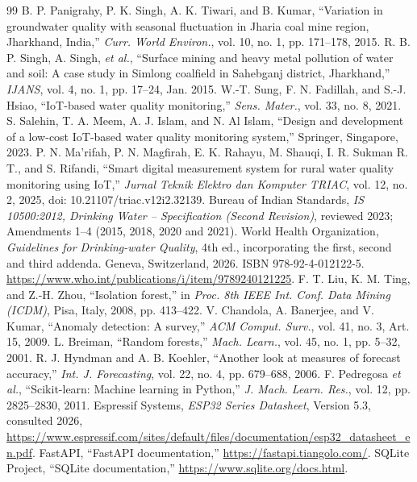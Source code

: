 \documentclass[10pt,letterpaper,twocolumn]{article}
\begin{document}
\footnotesize
\setlength{\itemsep}{0pt}
\setlength{\parskip}{0pt}
\begin{thebibliography}{99}
 B. P. Panigrahy, P. K. Singh, A. K. Tiwari, and B. Kumar, ``Variation in groundwater quality with seasonal fluctuation in Jharia coal mine region, Jharkhand, India,'' \emph{Curr. World Environ.}, vol. 10, no. 1, pp. 171--178, 2015.
 R. B. P. Singh, A. Singh, \emph{et al.}, ``Surface mining and heavy metal pollution of water and soil: A case study in Simlong coalfield in Sahebganj district, Jharkhand,'' \emph{IJANS}, vol. 4, no. 1, pp. 17--24, Jan. 2015.
 W.-T. Sung, F. N. Fadillah, and S.-J. Hsiao, ``IoT-based water quality monitoring,'' \emph{Sens. Mater.}, vol. 33, no. 8, 2021.
 S. Salehin, T. A. Meem, A. J. Islam, and N. Al Islam, ``Design and development of a low-cost IoT-based water quality monitoring system,'' Springer, Singapore, 2023.
 P. N. Ma'rifah, P. N. Magfirah, E. K. Rahayu, M. Shauqi, I. R. Sukman R. T., and S. Rifandi, ``Smart digital measurement system for rural water quality monitoring using IoT,'' \emph{Jurnal Teknik Elektro dan Komputer TRIAC}, vol. 12, no. 2, 2025, doi: 10.21107/triac.v12i2.32139.
 Bureau of Indian Standards, \emph{IS 10500:2012, Drinking Water -- Specification (Second Revision)}, reviewed 2023; Amendments 1--4 (2015, 2018, 2020 and 2021).
 World Health Organization, \emph{Guidelines for Drinking-water Quality}, 4th ed., incorporating the first, second and third addenda. Geneva, Switzerland, 2026. ISBN 978-92-4-012122-5. \url{https://www.who.int/publications/i/item/9789240121225}.
 F. T. Liu, K. M. Ting, and Z.-H. Zhou, ``Isolation forest,'' in \emph{Proc. 8th IEEE Int. Conf. Data Mining (ICDM)}, Pisa, Italy, 2008, pp. 413--422.
 V. Chandola, A. Banerjee, and V. Kumar, ``Anomaly detection: A survey,'' \emph{ACM Comput. Surv.}, vol. 41, no. 3, Art. 15, 2009.
 L. Breiman, ``Random forests,'' \emph{Mach. Learn.}, vol. 45, no. 1, pp. 5--32, 2001.
 R. J. Hyndman and A. B. Koehler, ``Another look at measures of forecast accuracy,'' \emph{Int. J. Forecasting}, vol. 22, no. 4, pp. 679--688, 2006.
 F. Pedregosa \emph{et al.}, ``Scikit-learn: Machine learning in Python,'' \emph{J. Mach. Learn. Res.}, vol. 12, pp. 2825--2830, 2011.
 Espressif Systems, \emph{ESP32 Series Datasheet}, Version 5.3, consulted 2026, \url{https://www.espressif.com/sites/default/files/documentation/esp32_datasheet_en.pdf}.
 FastAPI, ``FastAPI documentation,'' \url{https://fastapi.tiangolo.com/}.
 SQLite Project, ``SQLite documentation,'' \url{https://www.sqlite.org/docs.html}.
\end{thebibliography}
\end{document}
